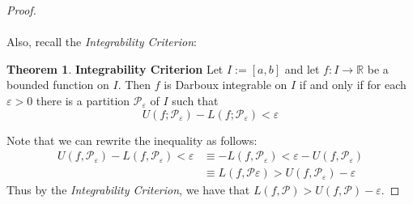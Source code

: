 \documentclass[12pt,letterpaper]{article}
\newcommand{\R}{\mathbb{R}}
\theoremstyle{case}
\theoremstyle{definition}
\newtheorem*{theorem*}{Theorem}
\begin{document}
\begin{enumerate}
\begin{enumerate}
\begin{proof}
				\\\\Also, recall the \textit{Integrability Criterion}:
				\begin{theorem*}{\textbf{Integrability Criterion}}
					Let $I:=[a,b]$ and let $f:I \to \R$ be a bounded function on $I$. Then $f$ is Darboux integrable on $I$ if and only if for each $\varepsilon > 0$ there is a partition $\mathcal{P}_\varepsilon$ of $I$ such that 
					\[U(f;\mathcal{P}_\varepsilon)-L(f;\mathcal{P}_\varepsilon)<\varepsilon\]
				\end{theorem*}
				Note that we can rewrite the inequality as follows:
				\begin{align*}
					U(f,\mathcal{P}_\varepsilon) -L(f,\mathcal{P}_\varepsilon) < \varepsilon &\equiv -L(f,\mathcal{P}_\varepsilon) < \varepsilon-U(f,\mathcal{P}_\varepsilon) \\
					&\equiv L(f,\mathcal{P}\varepsilon) > U(f,\mathcal{P}_\varepsilon) -\varepsilon
				\end{align*}
				Thus by the \textit{Integrability Criterion}, we have that $L(f,\mathcal{P})>U(f,\mathcal{P})-\varepsilon$.
			\end{proof}
		\end{enumerate}
	\end{enumerate}
\end{document}
